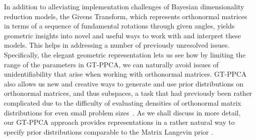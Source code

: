 \documentclass{article}
\begin{document}
In addition to alleviating implementation challenges of Bayesian dimensionality reduction models, the Givens Transform, which represents orthonormal matrices in terms of a sequence of fundamental rotations through given angles, yields geometric insights into novel and useful ways to work with and interpret these models.  This helps in addressing a number of previously unresolved issues.  Specifically, the elegant geometric representation lets us see how by limiting the range of the parameters in GT-PPCA, we can naturally avoid issues of unidentifiability that arise when working with orthonormal matrices.  GT-PPCA also allows us new and creative ways to generate and use prior distributions on orthonormal matrices, and thus subspaces, a task that had previously been rather complicated due to the difficulty of evaluating densities of orthonormal matrix distributions for even small problem sizes~\citep{hoff2009simulation}.  As we shall discuss in more detail, our GT-PPCA approach provides representations in a rather natural way to specify prior distributions comparable to the Matrix Langevin prior \citep{muirhead2009aspects}.

\end{document}

